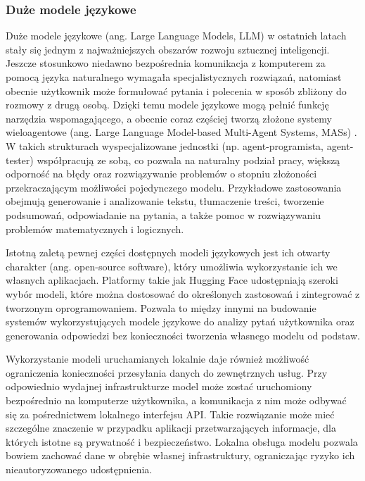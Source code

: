 \subsubsection{Duże modele językowe}

Duże modele językowe (ang. Large Language Models, LLM) w ostatnich latach stały się jednym z najważniejszych obszarów rozwoju sztucznej inteligencji. Jeszcze stosunkowo niedawno bezpośrednia komunikacja z komputerem za pomocą języka naturalnego wymagała specjalistycznych rozwiązań, natomiast obecnie użytkownik może formułować pytania i polecenia w sposób zbliżony do rozmowy z drugą osobą. Dzięki temu modele językowe mogą pełnić funkcję narzędzia wspomagającego, a obecnie coraz częściej tworzą złożone systemy wieloagentowe (ang. Large Language Model-based Multi-Agent Systems, MASs) \cite{llm_mas_techniques_and_business,ma_collaboration}. W takich strukturach wyspecjalizowane jednostki (np. agent-programista, agent-tester) współpracują ze sobą, co pozwala na naturalny podział pracy, większą odporność na błędy oraz rozwiązywanie problemów o stopniu złożoności przekraczającym możliwości pojedynczego modelu. Przykładowe zastosowania obejmują generowanie i analizowanie tekstu, tłumaczenie treści, tworzenie podsumowań, odpowiadanie na pytania, a także pomoc w rozwiązywaniu problemów matematycznych i logicznych.

Istotną zaletą pewnej części dostępnych modeli językowych jest ich otwarty charakter (ang. open-source software), który umożliwia wykorzystanie ich we własnych aplikacjach. Platformy takie jak Hugging Face udostępniają szeroki wybór modeli, które można dostosować do określonych zastosowań i zintegrować z tworzonym oprogramowaniem. Pozwala to między innymi na budowanie systemów wykorzystujących modele językowe do analizy pytań użytkownika oraz generowania odpowiedzi bez konieczności tworzenia własnego modelu od podstaw.

Wykorzystanie modeli uruchamianych lokalnie daje również możliwość ograniczenia konieczności przesyłania danych do zewnętrznych usług. Przy odpowiednio wydajnej infrastrukturze model może zostać uruchomiony bezpośrednio na komputerze użytkownika, a komunikacja z nim może odbywać się za pośrednictwem lokalnego interfejsu API. Takie rozwiązanie może mieć szczególne znaczenie w przypadku aplikacji przetwarzających informacje, dla których istotne są prywatność i bezpieczeństwo. Lokalna obsługa modelu pozwala bowiem zachować dane w obrębie własnej infrastruktury, ograniczając ryzyko ich nieautoryzowanego udostępnienia.

